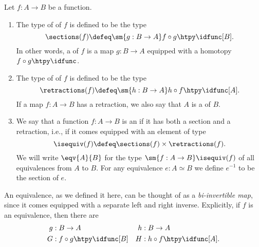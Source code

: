 \begin{defn}
  Let $f:A\to B$ be a function.
  \begin{enumerate}
  \item The type of  of $f$ is defined to be the type
    \begin{equation*}
      \sections(f) \defeq \sm{g:B\to A} f\circ g\htpy \idfunc[B].
    \end{equation*}
    In other words, a  of $f$ is a map $g:B\to A$ equipped with a homotopy $f\circ g\htpy \idfunc$. 
  \item The type of  of $f$ is defined to be the type
    \begin{equation*}
      \retractions(f) \defeq \sm{h:B\to A} h\circ f\htpy \idfunc[A].
    \end{equation*}
    If a map $f:A \to B$ has a retraction, we also say that $A$ is a  of $B$.
  \item We say that a function $f:A\to B$ is an  if it has both a section and a retraction, i.e., if it comes equipped with an element of type
    \begin{equation*}
      \isequiv(f)\defeq\sections(f)\times\retractions(f).
    \end{equation*}
    We will write $\eqv{A}{B}$ for the type $\sm{f:A\to B}\isequiv(f)$ of all equivalences from $A$ to $B$.
    For any equivalence $e:A\simeq B$ we define $e^{-1}$ to be the section of $e$.
  \end{enumerate}
\end{defn}

\begin{rmk}
An equivalence, as we defined it here, can be thought of as a \emph{bi-invertible map}, since it comes equipped with a separate left and right inverse. Explicitly, if $f$ is an equivalence, then there are
\begin{align*}
g & : B\to A & h & : B\to A \\
G & : f\circ g \htpy \idfunc[B] & H & : h\circ f \htpy \idfunc[A].
\end{align*}
\end{rmk}

